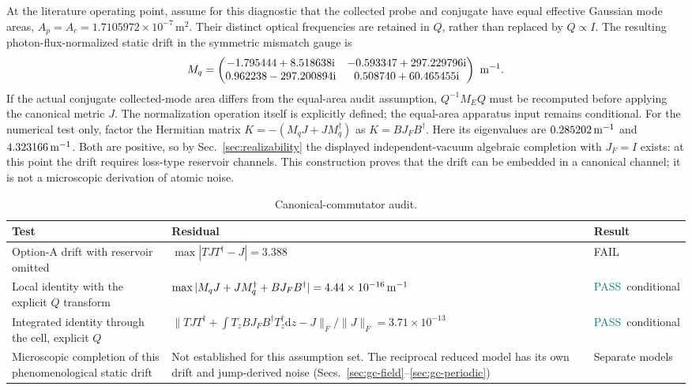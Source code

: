 \documentclass[11pt,a4paper]{article}
\newcommand{\dd}{\mathrm d}
\newcommand{\ii}{\mathrm i}
\newcommand{\pass}{\textcolor{teal}{PASS}}
\newcommand{\fail}{\textcolor{red!70!black}{FAIL}}
\begin{document}
At the literature operating point, assume for this diagnostic that
the collected probe and conjugate have equal effective Gaussian mode areas,
$A_p=A_c=1.7105972\times10^{-7}\,\mathrm{m^2}$. Their distinct optical
frequencies are retained in $Q$, rather than replaced by $Q\propto I$.
The resulting photon-flux-normalized static drift in the
symmetric mismatch gauge is
\begin{equation}
M_q=
\begin{pmatrix}
-1.795444+8.518638\ii&-0.593347+297.229796\ii\\
0.962238-297.200894\ii&0.508740+60.465455\ii
\end{pmatrix}\ {\rm m}^{-1}.
\label{eq:corrected-literature-drift}
\end{equation}
If the actual conjugate collected-mode area differs from the equal-area audit
assumption, $Q^{-1}M_EQ$ must be recomputed before applying the canonical
metric $J$. The normalization operation itself is explicitly defined; the
equal-area apparatus input remains conditional.
For the numerical test only, factor the Hermitian matrix
$K=-(M_qJ+JM_q^\dagger)$ as $K=BJ_FB^\dagger$. Here its eigenvalues are
$0.285202\,{\rm m}^{-1}$ and $4.323166\,{\rm m}^{-1}$. Both are positive, so
by Sec.~\ref{sec:realizability} the displayed independent-vacuum algebraic
completion with
$J_F=I$ exists: at this point the drift requires loss-type reservoir
channels.
This construction proves that the drift can be embedded in a canonical
channel; it is not a microscopic derivation of atomic noise.

\begin{table}[ht]
\centering
\caption{Canonical-commutator audit.}
\label{tab:commutator-test}
\small
\begin{tabularx}{\textwidth}{L{4.2cm}Y L{2.0cm}}
\toprule
Test & Residual & Result\\
\midrule
Option-A drift with reservoir omitted &
$\max|TJT^\dagger-J|=3.388$ & \fail\\
Local identity with the explicit $Q$ transform &
$\max|M_qJ+JM_q^\dagger+BJ_FB^\dagger|=4.44\times10^{-16}\,{\rm m}^{-1}$ &
\pass\ conditional\\
Integrated identity through the cell, explicit $Q$ &
$\|TJT^\dagger+\int T_zBJ_FB^\dagger T_z^\dagger\dd z-J\|_F/
\|J\|_F=3.71\times10^{-13}$ & \pass\ conditional\\
Microscopic completion of this phenomenological static drift &
Not established for this assumption set. The reciprocal reduced model has its own drift and jump-derived noise (Secs.~\ref{sec:gc-field}--\ref{sec:gc-periodic}) & Separate models\\
\bottomrule
\end{tabularx}
\end{table}
\end{document}
